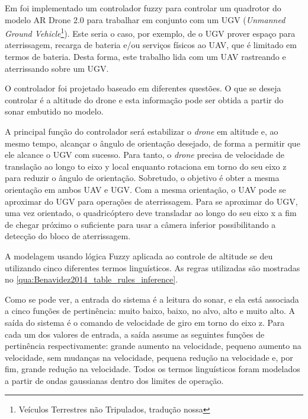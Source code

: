 Em \cite{Benavidez2014} foi implementado um controlador fuzzy para controlar um quadrotor do modelo AR Drone 2.0 para trabalhar em conjunto com um UGV (\textit{Unmanned Ground Vehicle}\footnote{Veículos Terrestres não Tripulados, tradução nossa}). Este seria o caso, por exemplo, de o UGV prover espaço para aterrissagem, recarga de bateria e/ou serviços físicos ao UAV, que é limitado em termos de bateria. Desta forma, este trabalho lida com um UAV rastreando e aterrissando sobre um UGV.

O controlador foi projetado baseado em diferentes questões. O que se deseja controlar é a altitude do drone e esta informação pode ser obtida a partir do sonar embutido no modelo.

A principal função do controlador será estabilizar o \textit{drone} em altitude e, ao mesmo tempo, alcançar o ângulo de orientação desejado, de forma a permitir que ele alcance o UGV com sucesso. Para tanto, o \textit{drone} precisa de velocidade de translação ao longo to eixo y local enquanto rotaciona em torno do seu eixo z para reduzir o ângulo de orientação. Sobretudo, o objetivo é obter a mesma orientação em ambos UAV e UGV. Com a mesma orientação, o UAV pode se aproximar do UGV para operações de aterrissagem. Para se aproximar do UGV, uma vez orientado, o quadricóptero deve transladar ao longo do seu eixo x a fim de chegar próximo o suficiente para usar a câmera inferior possibilitando a detecção do bloco de aterrissagem.

A modelagem usando lógica Fuzzy aplicada ao controle de altitude se deu utilizando cinco diferentes termos linguísticos. As regras utilizadas são mostradas no \autoref{qua:Benavidez2014_table_rules_inference}.



Como se pode ver, a entrada do sistema é a leitura do sonar, e ela está associada a cinco funções de pertinência: muito baixo, baixo, no alvo, alto e muito alto. A saída do sistema é o comando de velocidade de giro em torno do eixo z. Para cada um dos valores de entrada, a saída assume as seguintes funções de pertinência respectivamente: grande aumento na velocidade, pequeno aumento na velocidade, sem mudanças na velocidade, pequena redução na velocidade e, por fim, grande redução na velocidade. Todos os termos linguísticos foram modelados a partir de ondas gaussianas dentro dos limites de operação.

